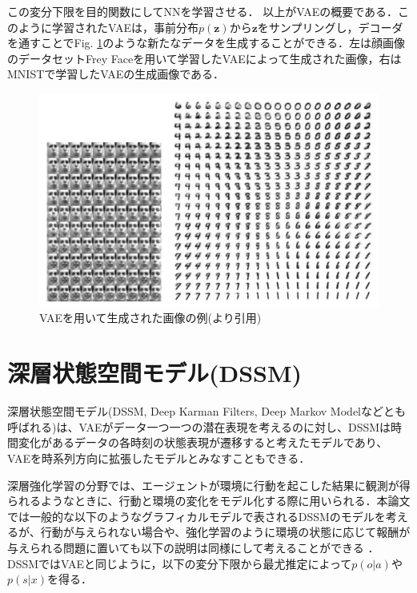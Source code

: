 この変分下限を目的関数にしてNNを学習させる．
以上がVAEの概要である．このように学習されたVAEは，事前分布$p(\bm{z})$から$\bm{z}$をサンプリングし，デコーダを通すことでFig. \ref{fig:vae_example}のような新たなデータを生成することができる．左は顔画像のデータセットFrey Faceを用いて学習したVAEによって生成された画像，右はMNISTで学習したVAEの生成画像である．

\begin{figure}[tbp]
  \begin{center}
    \includegraphics[width=\linewidth]{./figures/vae.png}
    \caption{VAEを用いて生成された画像の例(\cite{vae}より引用)}
    \label{fig:vae_example}
  \end{center}
\end{figure}

\section{深層状態空間モデル(DSSM)}
\label{section:dssm}

深層状態空間モデル(DSSM, Deep Karman Filters, Deep Markov Modelなどとも呼ばれる)は、VAEがデータ一つ一つの潜在表現を考えるのに対し、DSSMは時間変化があるデータの各時刻の状態表現が遷移すると考えたモデルであり、VAEを時系列方向に拡張したモデルとみなすこともできる．

深層強化学習の分野では、エージェントが環境に行動を起こした結果に観測が得られるようなときに、行動と環境の変化をモデル化する際に用いられる．本論文では一般的な以下のようなグラフィカルモデルで表されるDSSMのモデルを考えるが、行動が与えられない場合や、強化学習のように環境の状態に応じて報酬が与えられる問題に置いても以下の説明は同様にして考えることができる
．
DSSMではVAEと同じように，以下の変分下限から最尤推定によって$p(o|a)$や$p(s|x)$を得る．

